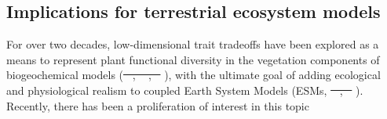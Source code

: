 \documentclass[
  12pt,
  letterpaper,
  DIV=11,
  numbers=noendperiod]{scrartcl}
\providecommand{\DIFadd}[1]{{\protect\color{blue}\uwave{#1}}} %
\providecommand{\DIFdel}[1]{{\protect\color{red}\sout{#1}}}                      %
\providecommand{\DIFaddbegin}{} %
\providecommand{\DIFaddend}{} %
\providecommand{\DIFdelbegin}{} %
\providecommand{\DIFdelend}{} %
\newcommand{\DIFscaledelfig}{0.5}
\newlength{\DIFdelgraphicswidth} %
\newlength{\DIFdelgraphicsheight} %
\newcommand{\DIFaddincludegraphics}[2][]{{\color{blue}\fbox{\DIFOincludegraphics[#1]{#2}}}} %
\newcommand{\DIFdelincludegraphics}[2][]{%
\sbox{\DIFdelgraphicsbox}{\DIFOincludegraphics[#1]{#2}}%
\settoboxwidth{\DIFdelgraphicswidth}{\DIFdelgraphicsbox} %
\settoboxtotalheight{\DIFdelgraphicsheight}{\DIFdelgraphicsbox} %
\scalebox{\DIFscaledelfig}{%
\parbox[b]{\DIFdelgraphicswidth}{\usebox{\DIFdelgraphicsbox}\\[-\baselineskip] \rule{\DIFdelgraphicswidth}{0em}}\llap{\resizebox{\DIFdelgraphicswidth}{\DIFdelgraphicsheight}{%
\setlength{\unitlength}{\DIFdelgraphicswidth}%
\begin{picture}(1,1)%
\thicklines\linethickness{2pt} %
{\color[rgb]{1,0,0}\put(0,0){\framebox(1,1){}}}%
{\color[rgb]{1,0,0}\put(0,0){\line( 1,1){1}}}%
{\color[rgb]{1,0,0}\put(0,1){\line(1,-1){1}}}%
\end{picture}%
}\hspace*{3pt}}} %
} %
\DeclareRobustCommand{\DIFaddbegin}{\DIFOaddbegin \let\includegraphics\DIFaddincludegraphics} %
\DeclareRobustCommand{\DIFaddend}{\DIFOaddend \let\includegraphics\DIFOincludegraphics} %
\DeclareRobustCommand{\DIFdelbegin}{\DIFOdelbegin \let\includegraphics\DIFdelincludegraphics} %
\DeclareRobustCommand{\DIFdelend}{\DIFOaddend \let\includegraphics\DIFOincludegraphics} %
\begin{document}
\subsection{Implications for terrestrial ecosystem
models}\label{implications-for-terrestrial-ecosystem-models}

For over two decades, low-dimensional trait tradeoffs have been explored
as a means to represent plant functional diversity in the vegetation
components of biogeochemical models (\DIFdelbegin \DIFdel{\mbox{%
\citeproc{ref-Moorcroft2001}{Moorcroft et al. 2001}}\hspace{0pt}%
,
\mbox{%
\citeproc{ref-Bonan2002}{Bonan et al. 2002}}\hspace{0pt}%
,
\mbox{%
\citeproc{ref-Verheijen2013}{Verheijen et al. 2013}}\hspace{0pt}%
}\DIFdelend \DIFaddbegin \DIFadd{\mbox{%
\citeproc{ref-Bonan2002}{Bonan et
al., 2002}}\hspace{0pt}%
; \mbox{%
\citeproc{ref-Moorcroft2001}{Moorcroft et al., 2001}}\hspace{0pt}%
;
\mbox{%
\citeproc{ref-Verheijen2013}{Verheijen et al., 2013}}\hspace{0pt}%
}\DIFaddend ), with the ultimate
goal of adding ecological and physiological realism to coupled Earth
System Models (ESMs, \DIFdelbegin \DIFdel{\mbox{%
\citeproc{ref-Moorcroft2006}{Moorcroft 2006}}\hspace{0pt}%
,
\mbox{%
\citeproc{ref-Wullschleger2014}{Wullschleger et al. 2014}}\hspace{0pt}%
}\DIFdelend \DIFaddbegin \DIFadd{\mbox{%
\citeproc{ref-Moorcroft2006}{Moorcroft, 2006}}\hspace{0pt}%
;
\mbox{%
\citeproc{ref-Wullschleger2014}{Wullschleger et al., 2014}}\hspace{0pt}%
}\DIFaddend ). Recently,
there has been a proliferation of interest in this topic
\end{document}
